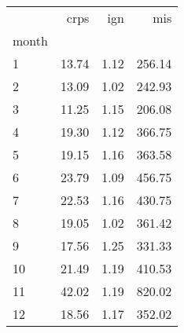\begin{tabular}{lrrr}
\toprule
 & crps & ign & mis \\
month &  &  &  \\
\midrule
1 & 13.74 & 1.12 & 256.14 \\
2 & 13.09 & 1.02 & 242.93 \\
3 & 11.25 & 1.15 & 206.08 \\
4 & 19.30 & 1.12 & 366.75 \\
5 & 19.15 & 1.16 & 363.58 \\
6 & 23.79 & 1.09 & 456.75 \\
7 & 22.53 & 1.16 & 430.75 \\
8 & 19.05 & 1.02 & 361.42 \\
9 & 17.56 & 1.25 & 331.33 \\
10 & 21.49 & 1.19 & 410.53 \\
11 & 42.02 & 1.19 & 820.02 \\
12 & 18.56 & 1.17 & 352.02 \\
\bottomrule
\end{tabular}
